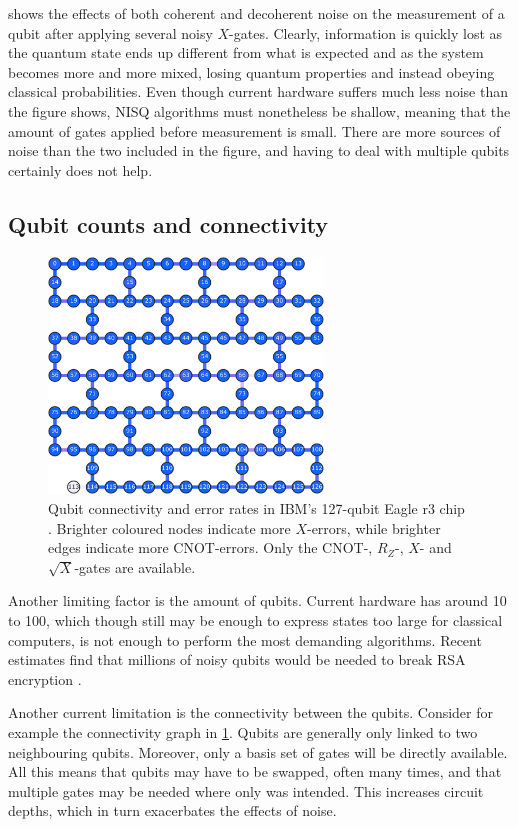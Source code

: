  shows the effects of both coherent and decoherent noise on the measurement of a qubit after applying several noisy $X$-gates.
Clearly, information is quickly lost as the quantum state ends up different from what is expected and as the system becomes more and more mixed, losing quantum properties and instead obeying classical probabilities.
Even though current hardware suffers much less noise than the figure shows, NISQ algorithms must nonetheless be shallow, meaning that the amount of gates applied before measurement is small.
There are more sources of noise than the two included in the figure, and having to deal with multiple qubits certainly does not help.

\subsection{Qubit counts and connectivity}
\begin{figure}
    \centering
    \includegraphics[width=0.65\textwidth]{connectivity.pdf}
    \caption{
        Qubit connectivity and error rates in IBM's 127-qubit Eagle r3 chip \cite{ibm_eagle}.
        Brighter coloured nodes indicate more $X$-errors, while brighter edges indicate more CNOT-errors.
        Only the CNOT-, $R_Z$-, $X$- and $\sqrt{X}$-gates are available.
    }
    \label{fig:connectivity}
\end{figure}
Another limiting factor is the amount of qubits.
Current hardware has around 10 to 100, which though still may be enough to express states too large for classical computers, is not enough to perform the most demanding algorithms.
Recent estimates find that millions of noisy qubits would be needed to break RSA encryption \cite{gidney2021}.

Another current limitation is the connectivity between the qubits.
Consider for example the connectivity graph in \cref{fig:connectivity}.
Qubits are generally only linked to two neighbouring qubits.
Moreover, only a basis set of gates will be directly available.
All this means that qubits may have to be swapped, often many times, and that multiple gates may be needed where only was intended.
This increases circuit depths, which in turn exacerbates the effects of noise.
